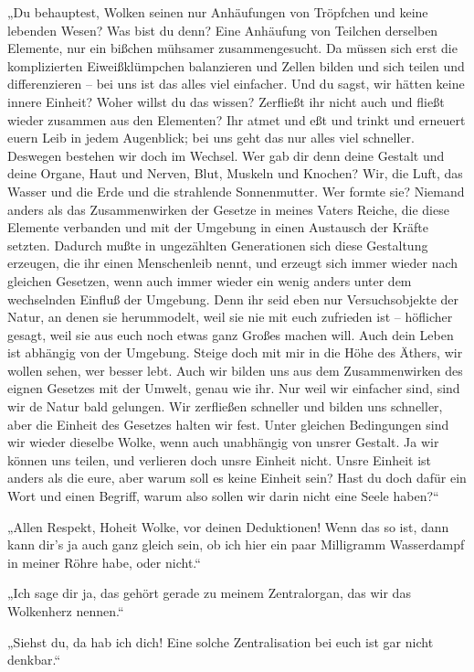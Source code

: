 „Du behauptest, Wolken seinen nur Anhäufungen von Tröpfchen und
keine lebenden Wesen? Was bist du denn? Eine Anhäufung von Teilchen
derselben Elemente, nur ein bißchen mühsamer zusammengesucht. Da
müssen sich erst die komplizierten Eiweißklümpchen balanzieren und
Zellen bilden und sich teilen und differenzieren – bei uns ist das
alles viel einfacher. Und du sagst, wir hätten keine innere
Einheit? Woher willst du das wissen? Zerfließt ihr nicht auch und
fließt wieder zusammen aus den Elementen? Ihr atmet und eßt und
trinkt und erneuert euern Leib in jedem Augenblick; bei uns geht
das nur alles viel schneller. Deswegen bestehen wir doch im
Wechsel. Wer gab dir denn deine Gestalt und deine Organe, Haut und
Nerven, Blut, Muskeln und Knochen? Wir, die Luft, das Wasser und
die Erde und die strahlende Sonnenmutter. Wer formte sie? Niemand
anders als das Zusammenwirken der Gesetze in meines Vaters Reiche,
die diese Elemente verbanden und mit der Umgebung in einen
Austausch der Kräfte setzten. Dadurch mußte in ungezählten
Generationen sich diese Gestaltung erzeugen, die ihr einen
Menschenleib nennt, und erzeugt sich immer wieder nach gleichen
Gesetzen, wenn auch immer wieder ein wenig anders unter dem
wechselnden Einfluß der Umgebung. Denn ihr seid eben nur
Versuchsobjekte der Natur, an denen sie herummodelt, weil sie nie
mit euch zufrieden ist – höflicher gesagt, weil sie aus euch noch
etwas ganz Großes machen will. Auch dein Leben ist abhängig von der
Umgebung. Steige doch mit mir in die Höhe des Äthers, wir wollen
sehen, wer besser lebt. Auch wir bilden uns aus dem Zusammenwirken
des eignen Gesetzes mit der Umwelt, genau wie ihr. Nur weil wir
einfacher sind, sind wir de Natur bald gelungen. Wir zerfließen
schneller und bilden uns schneller, aber die Einheit des Gesetzes
halten wir fest. Unter gleichen Bedingungen sind wir wieder
dieselbe Wolke, wenn auch unabhängig von unsrer Gestalt. Ja wir
können uns teilen, und verlieren doch unsre Einheit nicht. Unsre
Einheit ist anders als die eure, aber warum soll es keine Einheit
sein? Hast du doch dafür ein Wort und einen Begriff, warum also
sollen wir darin nicht eine Seele haben?“

„Allen Respekt, Hoheit Wolke, vor deinen Deduktionen! Wenn das so
ist, dann kann dir's ja auch ganz gleich sein, ob ich hier ein paar
Milligramm Wasserdampf in meiner Röhre habe, oder nicht.“

„Ich sage dir ja, das gehört gerade zu meinem Zentralorgan, das wir
das Wolkenherz nennen.“

„Siehst du, da hab ich dich! Eine solche Zentralisation bei euch
ist gar nicht denkbar.“

